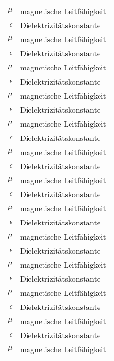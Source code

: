 \begin{nomenclature}
\begin{longtable}{rl}
  $\mu$      & magnetische Leitfähigkeit \\
  $\epsilon$ & Dielektrizitätskonstante  \\
  $\mu$      & magnetische Leitfähigkeit \\
  $\epsilon$ & Dielektrizitätskonstante  \\
  $\mu$      & magnetische Leitfähigkeit \\
  $\epsilon$ & Dielektrizitätskonstante  \\
  $\mu$      & magnetische Leitfähigkeit \\
  $\epsilon$ & Dielektrizitätskonstante  \\
  $\mu$      & magnetische Leitfähigkeit \\
  $\epsilon$ & Dielektrizitätskonstante  \\
  $\mu$      & magnetische Leitfähigkeit \\
  $\epsilon$ & Dielektrizitätskonstante  \\
  $\mu$      & magnetische Leitfähigkeit \\
  $\epsilon$ & Dielektrizitätskonstante  \\
  $\mu$      & magnetische Leitfähigkeit \\
  $\epsilon$ & Dielektrizitätskonstante  \\
  $\mu$      & magnetische Leitfähigkeit \\
  $\epsilon$ & Dielektrizitätskonstante  \\
  $\mu$      & magnetische Leitfähigkeit \\
  $\epsilon$ & Dielektrizitätskonstante  \\
  $\mu$      & magnetische Leitfähigkeit \\
  $\epsilon$ & Dielektrizitätskonstante  \\
  $\mu$      & magnetische Leitfähigkeit \\
  $\epsilon$ & Dielektrizitätskonstante  \\
  $\mu$      & magnetische Leitfähigkeit \\
\end{longtable}

\end{nomenclature}
